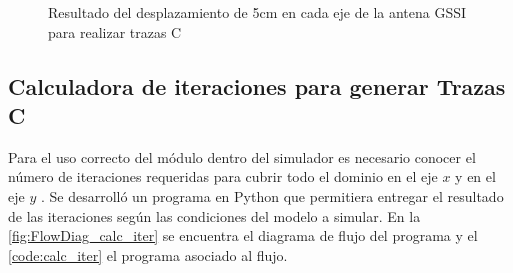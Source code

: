 \begin{figure}[H]  
\centering
{}

\caption{Resultado del desplazamiento de 5cm en cada eje de la antena GSSI para realizar trazas C}
\label{fig:exampleCscan1GSSI}


\end{figure}




\subsection{Calculadora de iteraciones para generar Trazas C}

Para el uso correcto del módulo dentro del simulador es necesario conocer el número de iteraciones requeridas para cubrir todo el dominio en el eje \(x\) y en el eje \(y\) . Se desarrolló un programa en Python que permitiera entregar el resultado de las iteraciones según las condiciones del modelo a simular. En la \figurename{ \ref{fig:FlowDiag_calc_iter}} se encuentra el diagrama de flujo del programa y el \lstlistingname{ \ref{code:calc_iter}} el programa asociado al flujo.


